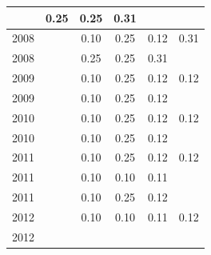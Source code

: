 \begin{table}[H]
\begin{tabular}{| l | c | c | c | c | c |}
          &
          0.25
          &
          0.25
          &
          0.31
          &
          \\
\hline
            2008
          &
          
          &
          0.10
          &
          0.25
          &
          0.12
          &
            {\color{red} 0.31}
          \\
            2008
          &
          
          &
          0.25
          &
          0.25
          &
          0.31
          &
          \\
\hline
            2009
          &
          
          &
          0.10
          &
          0.25
          &
          0.12
          &
            {\color{red} 0.12}
          \\
            2009
          &
          
          &
          0.10
          &
          0.25
          &
          0.12
          &
          \\
\hline
            2010
          &
          
          &
          0.10
          &
          0.25
          &
          0.12
          &
            {\color{red} 0.12}
          \\
            2010
          &
          
          &
          0.10
          &
          0.25
          &
          0.12
          &
          \\
\hline
            2011
          &
          
          &
          0.10
          &
          0.25
          &
          0.12
          &
            {\color{red} 0.12}
          \\
            2011
          &
          
          &
          0.10
          &
          0.10
          &
          0.11
          &
          \\
            2011
          &
          
          &
          0.10
          &
          0.25
          &
          0.12
          &
          \\
\hline
            2012
          &
          
          &
          0.10
          &
          0.10
          &
          0.11
          &
            {\color{red} 0.12}
          \\
            2012
          &
          

\end{tabular}
\end{table}

